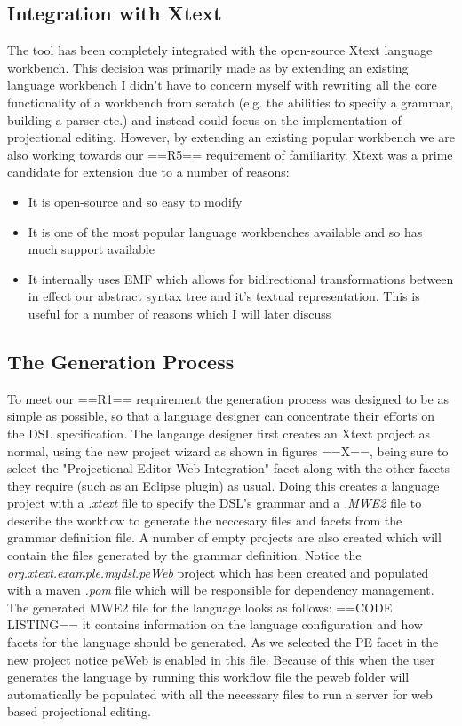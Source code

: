 \documentclass{article}
\begin{document}
\subsection{Integration with Xtext}\label{integrationWithXtext}
The tool has been completely integrated with the open-source Xtext language workbench. This decision was primarily made as by extending an existing language workbench I didn't have to concern myself with rewriting all the core functionality of a workbench from scratch (e.g. the abilities to specify a grammar, building a parser etc.) and instead could focus on the implementation of projectional editing. However, by extending an existing popular workbench we are also working towards our ==R5== requirement of familiarity.
 Xtext was a prime candidate for extension due to a number of reasons:
\begin{itemize}
\item{It is open-source and so easy to modify}
\item{It is one of the most popular language workbenches available and so has much support available}
\item{It internally uses EMF which allows for bidirectional transformations between in effect our abstract syntax tree and it's textual representation. This is useful for a number of reasons which I will later discuss}
\end{itemize}

\subsection{The Generation Process}
To meet our ==R1== requirement the generation process was designed to be as simple as possible, so that a language designer can concentrate their efforts on the DSL specification. The langauge designer first creates an Xtext project as normal, using the new project wizard as shown in figures ==X==, being sure to select the "Projectional Editor Web Integration" facet along with the other facets they require (such as an Eclipse plugin) as usual.
Doing this creates a language project with a \emph{.xtext} file to specify the DSL's grammar and a \emph{.MWE2} file to describe the workflow to generate the neccesary files and facets from the grammar definition file. A number of empty projects are also created which will contain the files generated by the grammar definition. Notice the \emph{org.xtext.example.mydsl.peWeb} project which has been created and populated with a maven \emph{.pom} file which will be responsible for dependency management.
The generated MWE2 file for the language looks as follows:
==CODE LISTING==
it contains information on the language configuration and how facets for the language should be generated. As we selected the PE facet in the new project notice peWeb is enabled in this file. Because of this when the user generates the language by running this workflow file the peweb folder will automatically be populated with all the necessary files to run a server for web based projectional editing.
\end{document}
